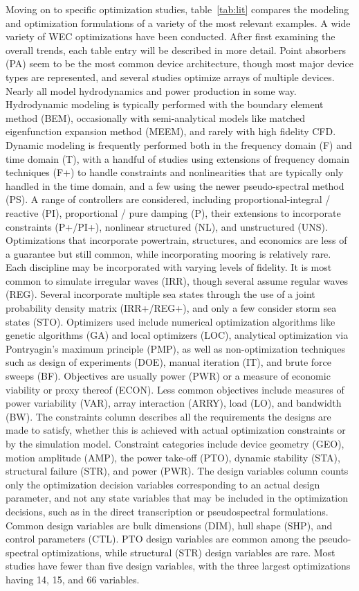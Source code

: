 Moving on to specific optimization studies, table~\ref{tab:lit} compares the modeling and optimization formulations of a variety of the most relevant examples.
A wide variety of WEC optimizations have been conducted.
After first examining the overall trends, each table entry will be described in more detail.
Point absorbers (PA) seem to be the most common device architecture, though most major device types are represented, and several studies optimize arrays of multiple devices.
Nearly all model hydrodynamics and power production in some way.
Hydrodynamic modeling is typically performed with the boundary element method (BEM), occasionally with semi-analytical models like matched eigenfunction expansion method (MEEM), and rarely with high fidelity CFD.
Dynamic modeling is frequently performed both in the frequency domain (F) and time domain (T), with a handful of studies using extensions of frequency domain techniques (F+) to handle constraints and nonlinearities that are typically only handled in the time domain, and a few using the newer pseudo-spectral method (PS).
A range of controllers are considered, including proportional-integral / reactive (PI), proportional / pure damping (P), their extensions to incorporate constraints (P+/PI+), nonlinear structured (NL), and unstructured (UNS).
Optimizations that incorporate powertrain, structures, and economics are less of a guarantee but still common, while incorporating mooring is relatively rare.
Each discipline may be incorporated with varying levels of fidelity.
It is most common to simulate irregular waves (IRR), though several assume regular waves (REG).
Several incorporate multiple sea states through the use of a joint probability density matrix (IRR+/REG+), and only a few consider storm sea states (STO).
Optimizers used include numerical optimization algorithms like genetic algorithms (GA) and local optimizers (LOC), analytical optimization via Pontryagin's maximum principle (PMP), as well as non-optimization techniques such as design of experiments (DOE), manual iteration (IT), and brute force sweeps (BF).
Objectives are usually power (PWR) or a measure of economic viability or proxy thereof (ECON).
Less common objectives include measures of power variability (VAR), array interaction (ARRY), load (LO), and bandwidth (BW).
The constraints column describes all the requirements the designs are made to satisfy, whether this is achieved with actual optimization constraints or by the simulation model.
Constraint categories include device geometry (GEO), motion amplitude (AMP), the power take-off (PTO), dynamic stability (STA), structural failure (STR), and power (PWR).
The design variables column counts only the optimization decision variables corresponding to an actual design parameter, and not any state variables that may be included in the optimization decisions, such as in the direct transcription or pseudospectral formulations.
Common design variables are bulk dimensions (DIM), hull shape (SHP), and control parameters (CTL).
PTO design variables are common among the pseudo-spectral optimizations, while structural (STR) design variables are rare.
Most studies have fewer than five design variables, with the three largest optimizations having 14, 15, and 66 variables.

